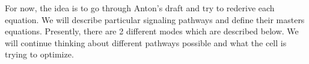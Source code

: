 For now, the idea is to go through Anton's draft and try to rederive each equation. We will describe particular signaling pathways and define their masters equations. Presently, there are 2 different modes which are described below. We will continue thinking about different pathways possible and what the cell is trying to optimize.